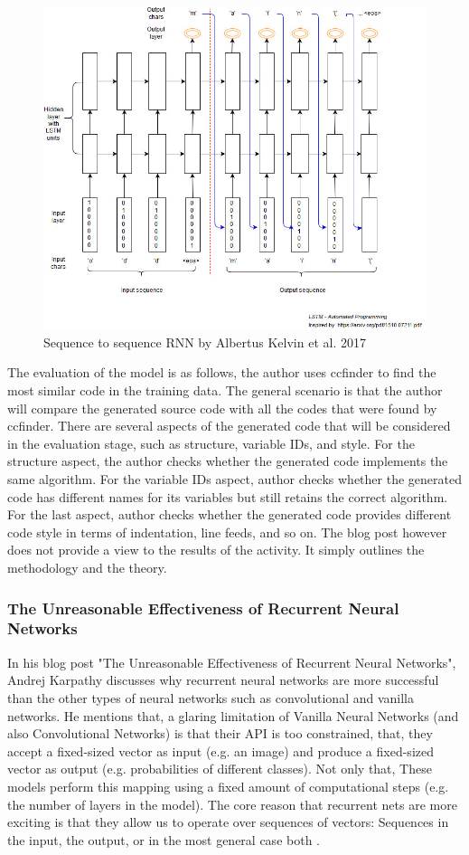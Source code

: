 \documentclass[conference, onecolumn, a4, 12pt]{IEEEtran}
\begin{document}
\begin{figure}
	\centering
	\includegraphics[width=0.7\linewidth]{RNN_model}
	\caption[Sequence to sequence RNN]{Sequence to sequence RNN by Albertus Kelvin et al. 2017}
	\label{fig6}
\end{figure}

The evaluation of the model is as follows, the author uses ccfinder \cite{a4} to find the most similar code in the training data. The general scenario is that the author will compare the generated source code with all the codes that were found by ccfinder. There are several aspects of the generated code that will be considered in the evaluation stage, such as structure, variable IDs, and style. For the structure aspect, the author checks whether the generated code implements the same algorithm. For the variable IDs aspect, author checks whether the generated code has different names for its variables but still retains the correct algorithm. For the last aspect, author checks whether the generated code provides different code style in terms of indentation, line feeds, and so on.\newline
The blog post however does not provide a view to the results of the activity. It simply outlines the methodology and the theory.

\subsubsection{The Unreasonable Effectiveness of Recurrent Neural Networks}
In his blog post "The Unreasonable Effectiveness of Recurrent Neural Networks", Andrej Karpathy discusses why recurrent neural networks are more successful than the other types of neural networks such as convolutional and vanilla networks. He mentions that, a glaring limitation of Vanilla Neural Networks (and also Convolutional Networks) is that their API is too constrained, that, they accept a fixed-sized vector as input (e.g. an image) and produce a fixed-sized vector as output (e.g. probabilities of different classes). Not only that, These models perform this mapping using a fixed amount of computational steps (e.g. the number of layers in the model). The core reason that recurrent nets are more exciting is that they allow us to operate over sequences of vectors: Sequences in the input, the output, or in the most general case both \cite{a11}.
\end{document}
